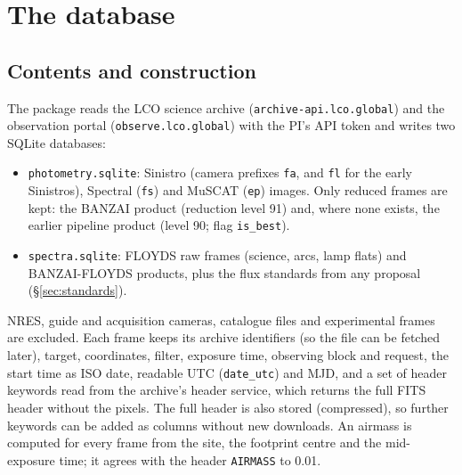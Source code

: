 \chapter{The database}\label{sec:db}
\section{Contents and construction}
The package \lcodb{} reads the LCO science archive (\texttt{archive-api.lco.global}) and the observation portal
(\texttt{observe.lco.global}) with the PI's API token and writes two SQLite databases:
\begin{itemize}\setlength{\itemsep}{1pt}
\item \texttt{photometry.sqlite}: Sinistro (camera prefixes \texttt{fa}, and \texttt{fl} for the early
  Sinistros), Spectral (\texttt{fs}) and MuSCAT (\texttt{ep}) images. Only reduced frames are kept: the BANZAI
  product (reduction level 91) and, where none exists, the earlier pipeline product (level 90; flag
  \texttt{is\_best}).
\item \texttt{spectra.sqlite}: FLOYDS raw frames (science, arcs, lamp flats) and BANZAI-FLOYDS products,
  plus the flux standards from any proposal (\S\ref{sec:standards}).
\end{itemize}
NRES, guide and acquisition cameras, catalogue files and experimental frames are excluded. Each frame keeps its
archive identifiers (so the file can be fetched later), target, coordinates, filter, exposure time, observing
block and request, the start time as ISO date, readable UTC (\texttt{date\_utc}) and MJD, and a set of header
keywords read from the archive's header service, which returns the full FITS header without the pixels. The
full header is also stored (compressed), so further keywords can be added as columns without new downloads.
An airmass is computed for every frame from the site, the footprint centre and the mid-exposure time; it agrees
with the header \texttt{AIRMASS} to 0.01.

